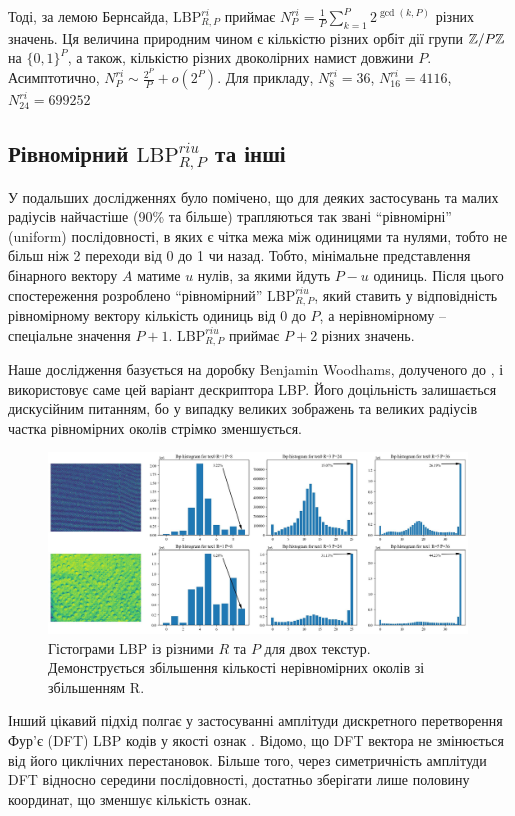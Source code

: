 Тоді, за лемою Бернсайда, $\mathrm{LBP}^{ri}_{R,P}$ приймає $N^{ri}_P = \frac{1}{P}\sum_{k=1}^P 2^{\operatorname{gcd}(k,P)}$ різних значень. 
Ця величина природним чином є кількістю різних орбіт дії групи $\mathbb Z/P\mathbb Z$ на $\{0,1\}^P$, а також, кількістю різних двоколірних намист довжини $P$.
Асимптотично, $N^{ri}_P \sim \frac{2^P}{P} + o(2^P)$. 
Для прикладу, $N^{ri}_8 = 36$, $N^{ri}_{16} = 4116$, $N^{ri}_{24} = 699252$

\subsection{Рівномірний \(\mathrm{LBP}_{R,P}^{riu}\) та інші}\label{section1.1d}\hfill

У подальших дослідженнях \cite{ojala2002} було помічено, що для деяких застосувань та малих радіусів найчастіше (90\% та більше) трапляються так звані ``рівномірні'' (uniform) послідовності, 
в яких є чітка межа між одиницями та нулями, тобто не більш ніж 2 переходи від 0 до 1 чи назад. 
Тобто, мінімальне представлення бінарного вектору $A$ матиме $u$ нулів, за якими йдуть $P-u$ одиниць.
Після цього спостереження розроблено ``рівномірний'' $\mathrm{LBP}^{riu}_{R,P}$, 
який ставить у відповідність рівномірному вектору кількість одиниць від $0$ до $P$, а нерівномірному -- спеціальне значення $P+1$.
$\mathrm{LBP}^{riu}_{R,P}$ приймає $P+2$ різних значень.

Наше дослідження \cite{fastlbp2024} базується на доробку Benjamin Woodhams, долученого до \cite{lee2025integrated}, і використовує саме цей варіант дескриптора LBP.
Його доцільність залишається дискусійним питанням, бо у випадку великих зображень та великих радіусів 
частка рівномірних околів стрімко зменшується.

\begin{figure}[h]
    \centering
    \includegraphics[width=0.99\textwidth]{img/cloth-hist-lbpu.jpg}
    \caption{
        Гістограми LBP із різними $R$ та $P$ для двох текстур.
        Демонструється збільшення кількості нерівномірних околів зі збільшенням R.
    }
    \label{fig:cloth-hist-lbpu}
\end{figure}

Інший цікавий підхід полгає у застосуванні амплітуди дискретного перетворення Фур'є (DFT) LBP кодів у якості ознак \cite{arof1998, haley1999}.
Відомо, що DFT вектора не змінюється від його циклічних перестановок. 
Більше того, через симетричність амплітуди DFT відносно середини послідовності, достатньо зберігати лише половину координат, що зменшує кількість ознак. 

